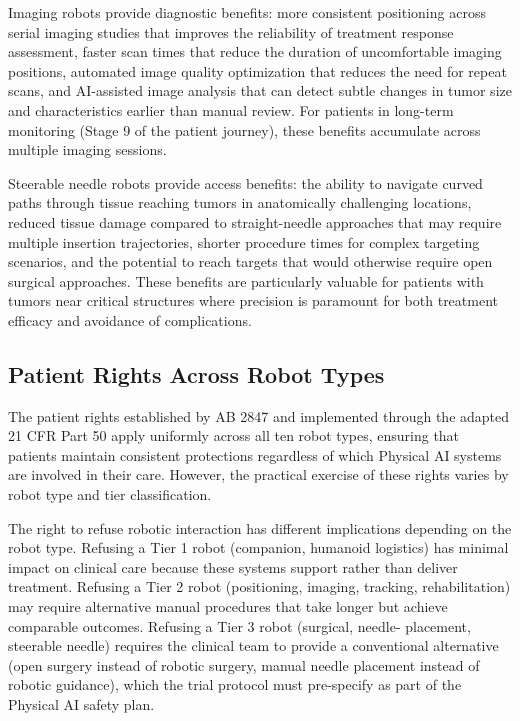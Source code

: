 Imaging robots provide diagnostic benefits: more consistent positioning
across serial imaging studies that improves the reliability of treatment
response assessment, faster scan times that reduce the duration of
uncomfortable imaging positions, automated image quality optimization that
reduces the need for repeat scans, and AI-assisted image analysis that can
detect subtle changes in tumor size and characteristics earlier than manual
review. For patients in long-term monitoring (Stage 9 of the patient journey),
these benefits accumulate across multiple imaging sessions.

Steerable needle robots provide access benefits: the ability to navigate
curved paths through tissue reaching tumors in anatomically challenging
locations, reduced tissue damage compared to straight-needle approaches that
may require multiple insertion trajectories, shorter procedure times for
complex targeting scenarios, and the potential to reach targets that would
otherwise require open surgical approaches. These benefits are particularly
valuable for patients with tumors near critical structures where precision is
paramount for both treatment efficacy and avoidance of complications.

\subsection{Patient Rights Across Robot Types}
\label{subsec:instructions-rights-summary}

The patient rights established by AB 2847 \cite{site-docs} and implemented
through the adapted 21 CFR Part 50 \cite{cfr50-adapt} apply uniformly across
all ten robot types, ensuring that patients maintain consistent protections
regardless of which Physical AI systems are involved in their care. However,
the practical exercise of these rights varies by robot type and tier
classification.

The right to refuse robotic interaction has different implications depending on
the robot type. Refusing a Tier 1 robot (companion, humanoid logistics) has
minimal impact on clinical care because these systems support rather than
deliver treatment. Refusing a Tier 2 robot (positioning, imaging, tracking,
rehabilitation) may require alternative manual procedures that take longer but
achieve comparable outcomes. Refusing a Tier 3 robot (surgical, needle-
placement, steerable needle) requires the clinical team to provide a
conventional alternative (open surgery instead of robotic surgery, manual
needle placement instead of robotic guidance), which the trial protocol must
pre-specify as part of the Physical AI safety plan.

